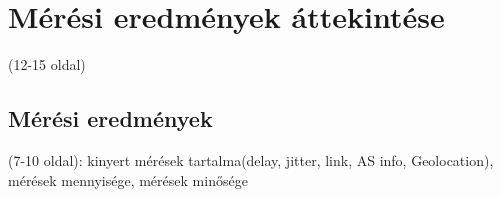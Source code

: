 \chapter{Mérési eredmények áttekintése}
(12-15 oldal)



\section{Mérési eredmények}
(7-10 oldal): kinyert mérések tartalma(delay, jitter, link, AS info, Geolocation), mérések mennyisége, mérések minősége

